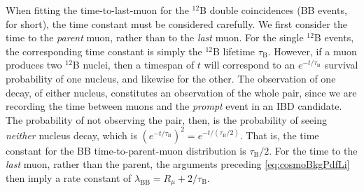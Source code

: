 \documentclass[../thesis.tex]{subfiles}
\begin{document}
When fitting the time-to-last-muon for the $^{12}$B double coincidences (BB events, for short), the time constant must be considered carefully. We first consider the time to the \emph{parent} muon, rather than to the \emph{last} muon. For the single $^{12}$B events, the corresponding time constant is simply the $^{12}$B lifetime $\tau_{\mathrm{B}}$.  However, if a muon produces two $^{12}$B nuclei, then a timespan of $t$ will correspond to an $e^{-t/\tau_{\mathrm{B}}}$ survival probability of one nucleus, and likewise for the other. The observation of one decay, of either nucleus, constitutes an observation of the whole pair, since we are recording the time between muons and the \emph{prompt} event in an IBD candidate. The probability of not observing the pair, then, is the probability of seeing \emph{neither} nucleus decay, which is $(e^{-t/\tau_{\mathrm{B}}})^2 = e^{-t/(\tau_{\mathrm{B}}/2)}$. That is, the time constant for the BB time-to-parent-muon distribution is $\tau_{\mathrm{B}}/2$. For the time to the \emph{last} muon, rather than the parent, the arguments preceding \autoref{eq:cosmoBkgPdfLi} then imply a rate constant of $\lambda_{\mathrm{BB}} = R_\mu + 2/\tau_{\mathrm{B}}$.
\begin{comment}
\footnote{We neglect the possibility of only seeing \emph{one} of the nuclei decay, since the IBD coincidence cut of \us{200} is far shorter than the $^{12}$B lifetime of 29~ms, and therefore, the observation of one decay effectively \emph{implies} the observation of the other.}

 As such, the time constant for BB events is $\tau_{\mathrm{B}}/2$. (I'm not sure I buy this. We are \emph{assuming} that the two decays occur within 200~us of each other, and the probability of seeing them both is basically equivalent to the probability of seeing the first, and the time-to-last-muon PDF for the first just has the time constant of $\tau$. Where the time constant \emph{does} get halved is if we consider a muon that produces two nuclei and we want the probability of seeing none i.e. the time to the next decay.)
\end{comment}

\begin{comment}
  YYY our code has the 12B half-life (20 ms) listed as the lifetime (should be 29 ms). This further exacerbates the use of the mistaken(???) factor of 2??? In total our time constant has been off by a factor of 3 (well, plus the Rmu part)
\end{comment}
\end{document}
